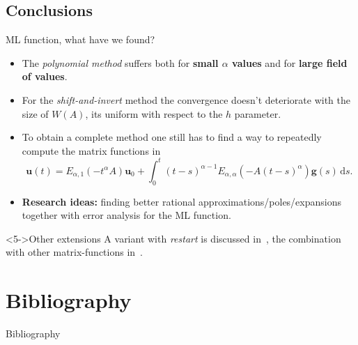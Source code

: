 \documentclass[aspectratio=169,xcolor=dvipsnames]{beamer}
\newcommand\unnumbered{\setbeamertemplate{footline}{}}%
\begin{document}
\subsection{Conclusions}

\begin{frame}{ML function, what have we found?}

\begin{itemize}
	\item<1->[\faCog] The \emph{polynomial method} suffers both for \textbf{small $\alpha$ values} and for \textbf{large field of values}.
	\item<2->[\faCog] For the \emph{shift-and-invert} method the convergence doesn't deteriorate with the size of $W(A)$, its uniform with respect to the $h$ parameter. 
	\item<3->[\faWrench] To obtain a complete method one still has to find a way to repeatedly compute the matrix functions in\vspace{-0.5em}
	\[
	\mathbf{u}(t) = E_{\alpha,1}(-t^\alpha A) \mathbf{u}_0 + \int_{0}^{t} (t-s)^{\alpha-1} E_{\alpha,\alpha}(-A(t-s)^\alpha)\mathbf{g}(s)\,\textrm{d}s.
	\]
	\item<4->[\faBinoculars] \textbf{Research ideas:} finding better rational approximations/poles/expansions together with error analysis for the ML function.
\end{itemize}

\begin{exampleblock}<5->{Other extensions}
	A variant with \emph{restart} is discussed in~\parencite{MoretPopolizio}, the combination with other matrix-functions in~\parencite{MoretNovatiFDEfunction}.
\end{exampleblock}


\end{frame}




\appendix

\section*{Bibliography}
{\unnumbered
	\begin{frame}{Bibliography}
	\small
	\printbibliography
	
\end{frame}
}
\end{document}
